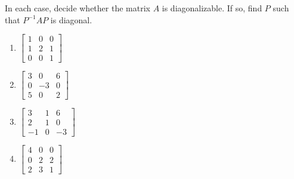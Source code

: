 \documentclass{ximera}
\begin{document}
  \begin{problem}
  In each case, decide whether the matrix $A$ is diagonalizable. If so, find $P$ such that $P^{-1}AP$ is diagonal.
   
  \begin{problem}\label{prb:diagonalizable}
  \begin{enumerate}
   
  \item $\begin{bmatrix}
  1 & 0 & 0 \\
  1 & 2 & 1 \\
  0 & 0 & 1
  \end{bmatrix}$
  \item $\begin{bmatrix}
  3 &  0 & 6 \\
  0 & -3 & 0 \\
  5 &  0 & 2
  \end{bmatrix}$
  \item $\begin{bmatrix}
   3 &  1 &  6 \\
   2 &  1 &  0 \\
  -1 &  0 & -3
  \end{bmatrix}$
  \item $\begin{bmatrix}
  4 & 0 & 0 \\
  0 & 2 & 2 \\
  2 & 3 & 1
  \end{bmatrix}$
  \end{enumerate}
  \end{problem}
   
   
  \end{problem}
   
\end{document}
